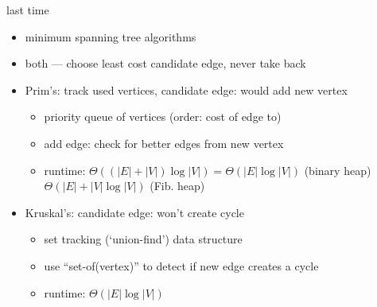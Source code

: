 \begin{comment}
\begin{frame}{last time}
    \begin{itemize}
    \item travelling salesperson problem
    \item i.e. min weight Hamiltonian cycle
        \begin{itemize}
        \item = visit all vertices once and return to start
        \end{itemize}
    \item the branch-and-bound idea
    \item lab preview:
        \begin{itemize}
        \item topological sort / naive TSP / report on TSP acceleration techs.
        \end{itemize}
    \item spanning tree --- connected graph with no cycles
        \begin{itemize}
        \item i.e. no extra edges
        \item application: transport network
        \end{itemize}
    \item minimum spanning tree: spanning tree with least weight
    \end{itemize}
\end{frame}
\end{comment}

\begin{frame}{last time}
    \begin{itemize}
    \item minimum spanning tree algorithms
    \item both  --- choose least cost candidate edge, never take back
    \item Prim's: track used vertices, candidate edge: would add new vertex
        \begin{itemize}
        \item priority queue of vertices (order: cost of edge to)
        \item add edge: check for better edges from new vertex
        \item runtime: $\Theta((|E|+|V|)\log|V|)= \Theta(|E|\log|V|)$ (binary heap) $\Theta(|E|+|V|\log|V|)$ (Fib. heap)
        \end{itemize}
    \item Kruskal's: candidate edge: won't create cycle
        \begin{itemize}
        \item set tracking (`union-find') data structure
        \item use ``set-of(vertex)'' to detect if new edge creates a cycle
        \item runtime: $\Theta(|E|\log|V|)$
        \end{itemize}
    \end{itemize}
\end{frame}
